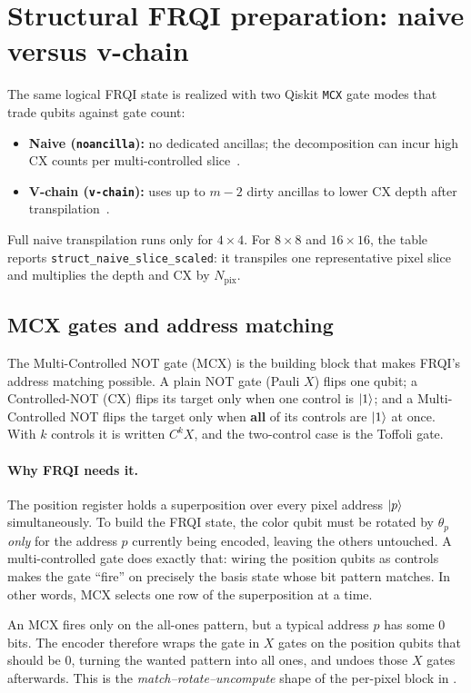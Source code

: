 \section{Structural FRQI preparation: naive versus v-chain}
\label{sec:struct-prep}
The same logical FRQI state is realized with two Qiskit \texttt{MCX} gate modes that trade qubits against gate count:
\begin{itemize}
  \item \textbf{Naive (\texttt{noancilla}):} no dedicated ancillas; the decomposition can incur high CX counts per multi-controlled slice~\cite{Zindorf2024EfficientMCG}.
  \item \textbf{V-chain (\texttt{v-chain}):} uses up to $m-2$ dirty ancillas to lower CX depth after transpilation~\cite{Vale2023MCSU2,Azevedo2024LowDepthMCG}.
\end{itemize}
Full naive transpilation runs only for $4\times 4$. For $8\times 8$ and $16\times 16$, the table reports \texttt{struct\_naive\_slice\_scaled}: it transpiles one representative pixel slice and multiplies the depth and CX by $N_{\mathrm{pix}}$.

\subsection{MCX gates and address matching}
\label{sec:mcx-explained}
The Multi-Controlled NOT gate (MCX) is the building block that makes FRQI's address matching possible. A plain NOT gate (Pauli $X$) flips one qubit; a Controlled-NOT (CX) flips its target only when one control is $\ket{1}$; and a Multi-Controlled NOT flips the target only when \textbf{all} of its controls are $\ket{1}$ at once. With $k$ controls it is written $C^{k}X$, and the two-control case is the Toffoli gate.

\paragraph{Why FRQI needs it.}
The position register holds a superposition over every pixel address $\ket{p}$ simultaneously. To build the FRQI state, the color qubit must be rotated by $\theta_p$ \emph{only} for the address $p$ currently being encoded, leaving the others untouched. A multi-controlled gate does exactly that: wiring the position qubits as controls makes the gate ``fire'' on precisely the basis state whose bit pattern matches. In other words, MCX selects one row of the superposition at a time.

An MCX fires only on the all-ones pattern, but a typical address $p$ has some $0$ bits. The encoder therefore wraps the gate in $X$ gates on the position qubits that should be $0$, turning the wanted pattern into all ones, and undoes those $X$ gates afterwards. This is the \emph{match--rotate--uncompute} shape of the per-pixel block in .

